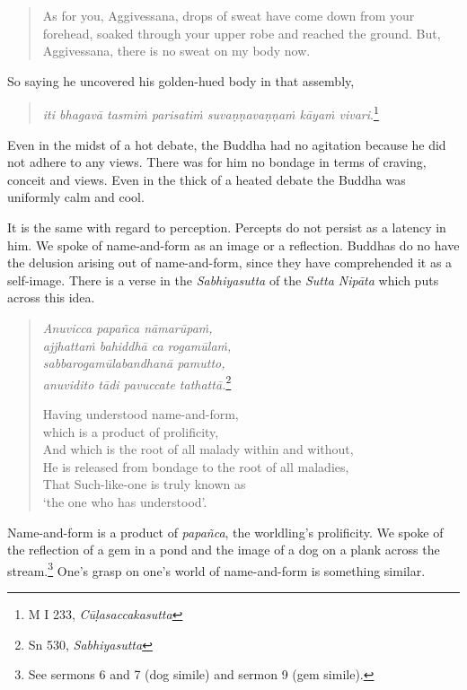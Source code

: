 \begin{quote}
As for you, Aggivessana, drops of sweat have come down from your forehead, soaked through your upper robe and reached the ground. But, Aggivessana, there is no sweat on my body now.
\end{quote}

So saying he uncovered his golden-hued body in that assembly,

\begin{quote}
\emph{iti bhagavā tasmiṁ parisatiṁ suvaṇṇavaṇṇaṁ kāyaṁ vivari}.\footnote{M I 233, \emph{Cūḷasaccakasutta}}
\end{quote}

Even in the midst of a hot debate, the Buddha had no agitation because he did not adhere to any views. There was for him no bondage in terms of craving, conceit and views. Even in the thick of a heated debate the Buddha was uniformly calm and cool.

It is the same with regard to perception. Percepts do not persist as a latency in him. We spoke of name-and-form as an image or a reflection. Buddhas do no have the delusion arising out of name-and-form, since they have comprehended it as a self-image. There is a verse in the \emph{Sabhiyasutta} of the \emph{Sutta Nipāta} which puts across this idea.

\begin{quote}
\emph{Anuvicca papañca nāmarūpaṁ,}\\
\emph{ajjhattaṁ bahiddhā ca rogamūlaṁ,}\\
\emph{sabbarogamūlabandhanā pamutto,}\\
\emph{anuvidito tādi pavuccate tathattā.}\footnote{Sn 530, \emph{Sabhiyasutta}}

Having understood name-and-form,\\
\vin which is a product of prolificity,\\
And which is the root of all malady within and without,\\
He is released from bondage to the root of all maladies,\\
That Such-like-one is truly known as\\
\vin `the one who has understood'.
\end{quote}

Name-and-form is a product of \emph{papañca}, the worldling's prolificity. We spoke of the reflection of a gem in a pond and the image of a dog on a plank across the stream.\footnote{See sermons 6 and 7 (dog simile) and sermon 9 (gem simile).} One's grasp on one's world of name-and-form is something similar.

